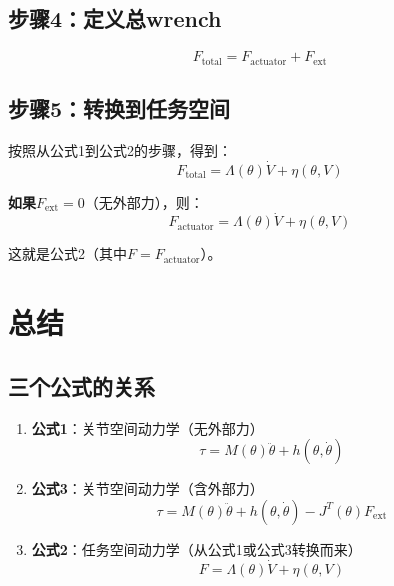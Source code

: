\documentclass[12pt,a4paper]{article}
\begin{document}
\subsection{步骤4：定义总wrench}

\begin{equation}
F_{\text{total}} = F_{\text{actuator}} + F_{\text{ext}}
\end{equation}

\subsection{步骤5：转换到任务空间}

按照从公式1到公式2的步骤，得到：
\begin{equation}
F_{\text{total}} = \Lambda(\theta)\dot{V} + \eta(\theta, V)
\end{equation}

\textbf{如果$F_{\text{ext}} = 0$}（无外部力），则：
\begin{equation}
F_{\text{actuator}} = \Lambda(\theta)\dot{V} + \eta(\theta, V)
\end{equation}

这就是公式2（其中$F = F_{\text{actuator}}$）。

\section{总结}

\subsection{三个公式的关系}

\begin{enumerate}
\item \textbf{公式1}：关节空间动力学（无外部力）
\begin{equation}
\tau = M(\theta)\ddot{\theta} + h(\theta, \dot{\theta})
\end{equation}

\item \textbf{公式3}：关节空间动力学（含外部力）
\begin{equation}
\tau = M(\theta)\ddot{\theta} + h(\theta, \dot{\theta}) - J^T(\theta)F_{\text{ext}}
\end{equation}

\item \textbf{公式2}：任务空间动力学（从公式1或公式3转换而来）
\begin{equation}
F = \Lambda(\theta)\dot{V} + \eta(\theta, V)
\end{equation}
\end{enumerate}
\end{document}
